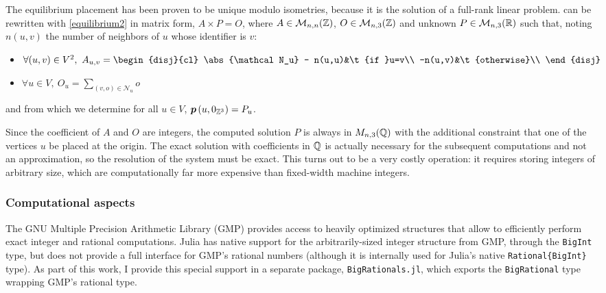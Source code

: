 \documentclass[main.tex]{subfiles}
\begin{document}
The equilibrium placement has been proven to be unique modulo isometries, because it is the solution of a full-rank linear problem\autocite{barycentric}.
 can be rewritten with \cref{equilibrium2} in matrix form, $A\times P = O$, where $A\in\mathcal{M}_{n,n}(\mathbb{Z})$, $O\in\mathcal{M}_{n,3}(\mathbb{Z})$ and unknown $P\in\mathcal{M}_{n,3}(\mathbb{R})$ such that, noting $n(u,v)$ the number of neighbors of $u$ whose identifier is $v$:
\begin{itemize}[noitemsep]
	\item $\forall (u,v)\in V^2,\ A_{u,v} = \begin{disj}{cl}
		\abs{\mathcal N_u} - n(u,u)&\t{if }u=v\\
		-n(u,v)&\t{otherwise}\\
	\end{disj}$%
	\item $\forall u\in V,\ O_u = \sum\limits_{(v,o)\in \mathcal N_u}o$
\end{itemize}
and from which we determine for all $u\in V$, $\boldsymbol p\left(u, 0_{\mathbb{Z}^3}\right) = P_u$.

Since the coefficient of $A$ and $O$ are integers, the computed solution $P$ is always in $M_{n,3}(\mathbb{Q})$ with the additional constraint that one of the vertices $u$ be placed at the origin. The exact solution with coefficients in $\mathbb{Q}$ is actually necessary for the subsequent computations and not an approximation, so the resolution of the system must be exact. This turns out to be a very costly operation: it requires storing integers of arbitrary size, which are computationally far more expensive than fixed-width machine integers.

\subsubsection{Computational aspects}

The GNU Multiple Precision Arithmetic Library (GMP) \autocite{GMP} provides access to heavily optimized structures that allow to efficiently perform exact integer and rational computations. Julia has native support for the arbitrarily-sized integer structure from GMP, through the \texttt{BigInt} type, but does not provide a full interface for GMP's rational numbers (although it is internally used for Julia's native \texttt{Rational\{BigInt\}} type). As part of this work, I provide this special support in a separate package, \texttt{BigRationals.jl}, which exports the \texttt{BigRational} type wrapping GMP's rational type.
\end{document}
